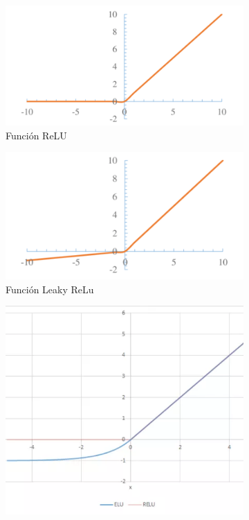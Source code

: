 \begin{figure}
        \begin{subfigure}[h]{0.45\textwidth} 
            \includegraphics[width=\textwidth]{imagenes/Cap4/relu}
            \caption{Funci\'{o}n ReLU}
            \label{fig:relu}
        \end{subfigure}       
        \begin{subfigure}[h]{0.45\textwidth} 
            \includegraphics[width=\textwidth]{imagenes/Cap4/l_relu}
            \caption{Funci\'{o}n Leaky ReLu}
            \label{fig:l_relu}
        \end{subfigure}
        \begin{subfigure}[h]{0.45\textwidth} 
            \includegraphics[width=\textwidth]{imagenes/Cap4/elu}

\end{subfigure}
\end{figure}
